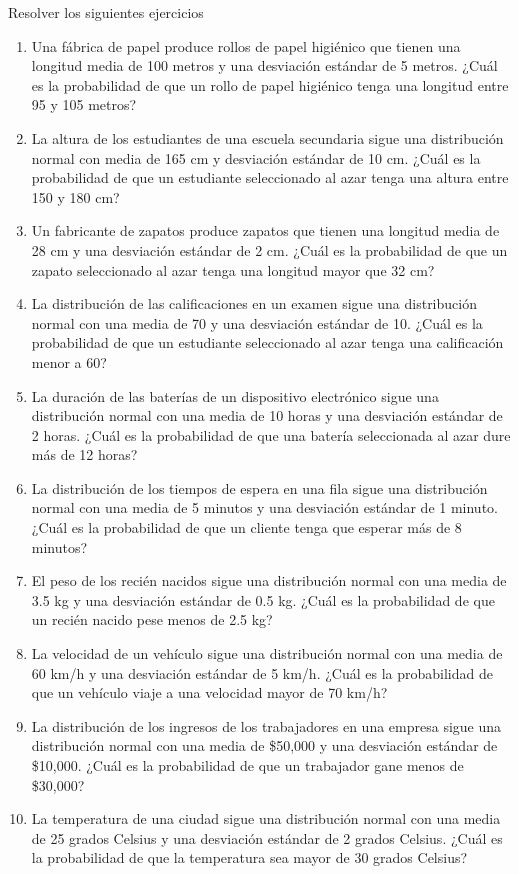 \begin{Ejer}  Resolver los siguientes ejercicios

\begin{enumerate}
    \item Una fábrica de papel produce rollos de papel higiénico que tienen una longitud media de 100 metros y una desviación estándar de 5 metros. ¿Cuál es la probabilidad de que un rollo de papel higiénico tenga una longitud entre 95 y 105 metros?
    \item La altura de los estudiantes de una escuela secundaria sigue una distribución normal con media de 165 cm y desviación estándar de 10 cm. ¿Cuál es la probabilidad de que un estudiante seleccionado al azar tenga una altura entre 150 y 180 cm?
    \item Un fabricante de zapatos produce zapatos que tienen una longitud media de 28 cm y una desviación estándar de 2 cm. ¿Cuál es la probabilidad de que un zapato seleccionado al azar tenga una longitud mayor que 32 cm?
    \item La distribución de las calificaciones en un examen sigue una distribución normal con una media de 70 y una desviación estándar de 10. ¿Cuál es la probabilidad de que un estudiante seleccionado al azar tenga una calificación menor a 60?
    \item La duración de las baterías de un dispositivo electrónico sigue una distribución normal con una media de 10 horas y una desviación estándar de 2 horas. ¿Cuál es la probabilidad de que una batería seleccionada al azar dure más de 12 horas?
    \item La distribución de los tiempos de espera en una fila sigue una distribución normal con una media de 5 minutos y una desviación estándar de 1 minuto. ¿Cuál es la probabilidad de que un cliente tenga que esperar más de 8 minutos?
    \item El peso de los recién nacidos sigue una distribución normal con una media de 3.5 kg y una desviación estándar de 0.5 kg. ¿Cuál es la probabilidad de que un recién nacido pese menos de 2.5 kg?
    \item La velocidad de un vehículo sigue una distribución normal con una media de 60 km/h y una desviación estándar de 5 km/h. ¿Cuál es la probabilidad de que un vehículo viaje a una velocidad mayor de 70 km/h?
    \item La distribución de los ingresos de los trabajadores en una empresa sigue una distribución normal con una media de \$50{,}000 y una desviación estándar de \$10{,}000. ¿Cuál es la probabilidad de que un trabajador gane menos de \$30{,}000?
    \item La temperatura de una ciudad sigue una distribución normal con una media de 25 grados Celsius y una desviación estándar de 2 grados Celsius. ¿Cuál es la probabilidad de que la temperatura sea mayor de 30 grados Celsius?

\end{enumerate}
\end{Ejer} 


